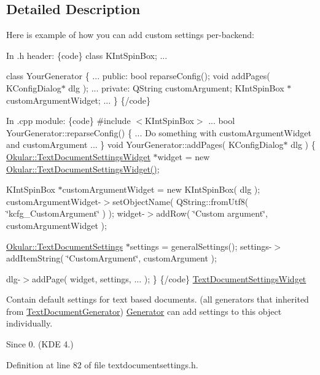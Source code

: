 \subsection{Detailed Description}
Here is example of how you can add custom settings per-\/backend\+:

In .h header\+: \{code\} class K\+Int\+Spin\+Box; ...

class Your\+Generator \{ ... public\+: bool reparse\+Config(); void add\+Pages( K\+Config\+Dialog$\ast$ dlg ); ... private\+: Q\+String custom\+Argument; K\+Int\+Spin\+Box $\ast$custom\+Argument\+Widget; ... \} \{/code\}

In .cpp module\+: \{code\} \#include $<$\+K\+Int\+Spin\+Box$>$ ... bool Your\+Generator\+::reparse\+Config() \{ ... Do something with custom\+Argument\+Widget and custom\+Argument ... \} void Your\+Generator\+::add\+Pages( K\+Config\+Dialog$\ast$ dlg ) \{ \hyperlink{classOkular_1_1TextDocumentSettingsWidget}{Okular\+::\+Text\+Document\+Settings\+Widget} $\ast$widget = new \hyperlink{classOkular_1_1TextDocumentSettingsWidget}{Okular\+::\+Text\+Document\+Settings\+Widget()};

K\+Int\+Spin\+Box $\ast$custom\+Argument\+Widget = new K\+Int\+Spin\+Box( dlg ); custom\+Argument\+Widget-\/$>$set\+Object\+Name( Q\+String\+::from\+Utf8( \char`\"{}kcfg\+\_\+\+Custom\+Argument\char`\"{} ) ); widget-\/$>$add\+Row( \char`\"{}\+Custom argument\char`\"{}, custom\+Argument\+Widget );

\hyperlink{classOkular_1_1TextDocumentSettings}{Okular\+::\+Text\+Document\+Settings} $\ast$settings = general\+Settings(); settings-\/$>$add\+Item\+String( \char`\"{}\+Custom\+Argument\char`\"{}, custom\+Argument );

dlg-\/$>$add\+Page( widget, settings, ... ); \} \{/code\} \hyperlink{classOkular_1_1TextDocumentSettingsWidget}{Text\+Document\+Settings\+Widget}

Contain default settings for text based documents. (all generators that inherited from \hyperlink{classOkular_1_1TextDocumentGenerator}{Text\+Document\+Generator}) \hyperlink{classOkular_1_1Generator}{Generator} can add settings to this object individually.

\begin{DoxySince}{Since}
0. (K\+D\+E 4.) 
\end{DoxySince}


Definition at line 82 of file textdocumentsettings.\+h.




